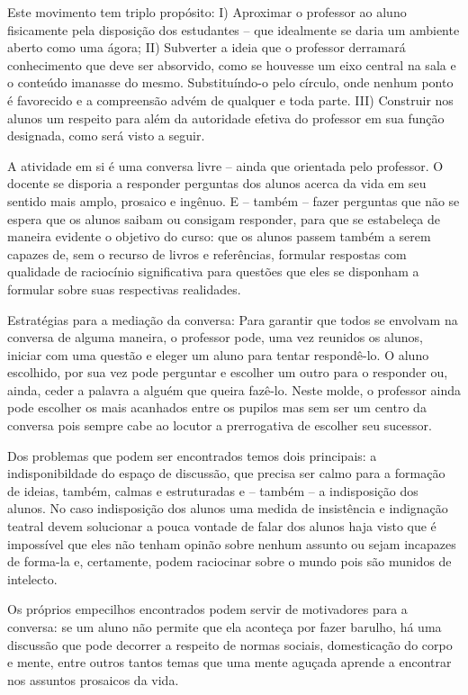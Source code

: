 \documentclass[12pt,a4paper]{article}
\begin{document}
	Este movimento tem triplo propósito: I) Aproximar o 
	professor ao aluno fisicamente pela disposição dos 
	estudantes -- que idealmente se daria um ambiente aberto como 
	uma ágora; II) Subverter a ideia que o professor 
	derramará conhecimento que deve ser absorvido, como se houvesse
	um eixo central na sala e o conteúdo imanasse do mesmo. 
	Substituíndo-o pelo círculo, onde nenhum ponto é favorecido e 
	a compreensão advém de qualquer e toda parte. III) 
	Construir nos alunos um respeito para além da autoridade efetiva
	do professor em sua função designada, como será visto a seguir.

	A atividade em si é uma conversa livre -- ainda que orientada 
	pelo professor. O docente se disporia a responder perguntas dos 
	alunos acerca da vida em seu sentido mais amplo, prosaico e 
	ingênuo. E -- também -- fazer perguntas que não se espera que 
	os alunos saibam ou consigam responder, para que se estabeleça 
	de maneira evidente o objetivo do curso: que os alunos passem 
	também a serem capazes de, sem o recurso de livros e referências,
	formular respostas com qualidade de raciocínio significativa 
	para questões que eles se disponham a formular sobre suas 
	respectivas realidades.
	
	Estratégias para a mediação da conversa: Para garantir que todos 
	se envolvam na conversa de alguma maneira, o professor pode, uma 
	vez reunidos os alunos, iniciar com uma questão e eleger um aluno 
	para tentar respondê-lo. O aluno escolhido, por sua vez pode 
	perguntar e escolher um outro para o responder ou, ainda, ceder a 
	palavra a alguém que queira fazê-lo. Neste molde, o professor 
	ainda pode escolher os mais acanhados entre os pupilos mas sem 
	ser um centro da conversa pois sempre cabe ao locutor a 
	prerrogativa de escolher seu sucessor.
	
	Dos problemas que podem ser encontrados temos dois principais:
	a indisponibildade do espaço de discussão, que precisa ser calmo 
	para a formação de ideias, também, calmas e estruturadas e -- 
	também -- a indisposição dos alunos. No caso indisposição dos 
	alunos uma medida de insistência e indignação teatral devem 
	solucionar a pouca vontade de falar dos alunos haja visto que é 
	impossível que eles não tenham opinão sobre nenhum assunto ou 
	sejam incapazes de forma-la e, certamente, podem raciocinar sobre 
	o mundo pois são munidos de intelecto.

	Os próprios empecilhos encontrados podem servir de motivadores 
	para a conversa: se um aluno não permite que ela aconteça por 
	fazer barulho, há uma discussão que pode decorrer a respeito 
	de normas sociais, domesticação do corpo e mente, entre outros 
	tantos temas que uma mente aguçada aprende a encontrar nos 
	assuntos prosaicos da vida.
\end{document}
